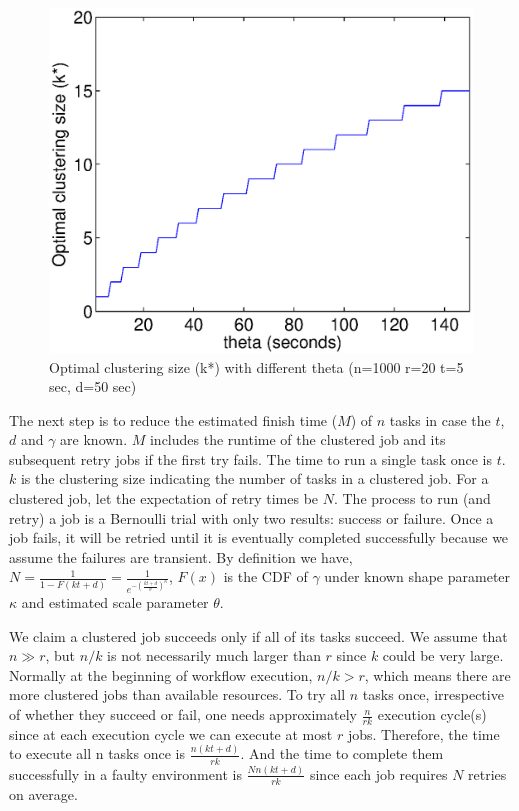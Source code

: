\documentclass{IOS-Book-Article}
\begin{document}
\begin{figure}[!htb]
\centering
  \includegraphics[width=0.95\linewidth]{figure6.eps}
  \caption{Optimal clustering size (k*) with different  theta (n=1000 r=20 t=5 sec, d=50 sec)}
  \label{fig:model_makespan}
\end{figure}

The next step is to reduce the estimated finish time ($M$) of $n$ tasks in case the $t$, $d$ and $\gamma$ are known. $M$ includes the runtime of the clustered job and its subsequent retry jobs if the first try fails. The time to run a single task once is $t$. $k$ is the clustering size indicating the number of tasks in a clustered job. For a clustered job, let the expectation of retry times be $N$. The process to run (and retry) a job is a Bernoulli trial with only two results: success or failure. Once a job fails, it will be retried until it is eventually completed successfully because we assume the failures are transient. By definition we have, 
$\displaystyle
N=\frac{1}{1-F(kt+d)}=\frac{1}{e^{-(\displaystyle\frac{kt+d}{\theta})^{\kappa}}}
$, $F(x)$ is the CDF of $\gamma$ under known shape parameter $\kappa$ and estimated scale parameter $\theta$. 



We claim a clustered job succeeds only if all of its tasks succeed. 
We assume that $n \gg r$, but $n/k$ is not necessarily much larger than $r$ since $k$ could be very large. Normally at the beginning of workflow execution, $n/k > r$, which means there are more clustered jobs than available resources. To try all $n$ tasks once, irrespective of whether they succeed or fail, one needs approximately $\displaystyle \frac{n}{rk}$ execution cycle(s) since at each execution cycle we can execute at most $r$ jobs. Therefore, the time to execute all n tasks once is $\displaystyle\frac{n(kt+d)}{rk}$. And the time to complete them successfully in a faulty environment is $\displaystyle\frac{Nn(kt+d)}{rk} $ since each job requires $N$ retries on average.  
\end{document}
